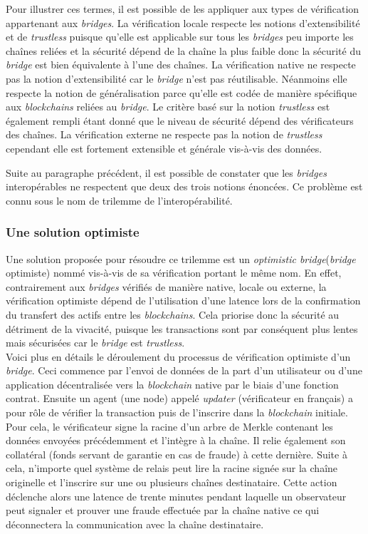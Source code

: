 Pour illustrer ces termes, il est possible de les appliquer aux types de vérification appartenant aux \textit{bridges}. La vérification locale respecte les notions d’extensibilité et de \textit{trustless} puisque qu'elle est applicable sur tous les \textit{bridges} peu importe les chaînes reliées et la sécurité dépend de la chaîne la plus faible donc la sécurité du \textit{bridge} est bien équivalente à l’une des chaînes.
La vérification native ne respecte pas la notion d’extensibilité car le \textit{bridge} n’est pas réutilisable. Néanmoins elle respecte la notion de généralisation parce qu’elle est codée de manière spécifique aux \textit{\gls{blockchain}s} reliées au \textit{bridge}. Le critère basé sur la notion \textit{trustless} est également rempli étant donné que le niveau de sécurité dépend des vérificateurs des chaînes.
La vérification externe ne respecte pas la notion de \textit{trustless} cependant elle est fortement extensible et générale vis-à-vis des données. \cite{NgraveVerif}

 Suite au paragraphe précédent, il est possible de constater que les \textit{bridges} interopérables ne respectent que deux des trois notions énoncées. Ce problème est connu sous le nom de trilemme de l’interopérabilité. 

\subsubsection{Une solution optimiste}

Une solution proposée pour résoudre ce trilemme est un \textit{optimistic bridge}(\textit{bridge} optimiste) nommé vis-à-vis de sa vérification portant le même nom\cite{OptimisticBhuptani}. En effet, contrairement aux \textit{bridges} vérifiés de manière native, locale ou externe, la vérification optimiste dépend de l’utilisation d’une latence lors de la confirmation du transfert des \gls{actif}s entre les \textit{\gls{blockchain}s}. Cela priorise donc la sécurité au détriment de la vivacité, puisque les transactions sont par conséquent plus lentes mais sécurisées car le \textit{bridge} est \textit{trustless}. \\

Voici plus en détails le déroulement du processus de vérification optimiste d’un \textit{bridge}.
Ceci commence par l’envoi de données de la part d’un utilisateur ou d’une application décentralisée vers la \textit{\gls{blockchain}} native par le biais d’une fonction contrat.
Ensuite un agent (une node) appelé \textit{updater} (vérificateur en français) a pour rôle de vérifier la transaction puis de l’inscrire dans la \textit{\gls{blockchain}} initiale. Pour cela, le vérificateur signe la racine d’un arbre de Merkle contenant les données envoyées précédemment et l’intègre à la chaîne. Il relie également son collatéral (fonds servant de garantie en cas de fraude) à cette dernière.
Suite à cela, n’importe quel système de relais peut lire la racine signée sur la chaîne originelle et l’inscrire sur une ou plusieurs chaînes destinataire. Cette action déclenche alors une latence de trente minutes pendant laquelle un observateur peut signaler et prouver une fraude effectuée par la chaîne native ce qui déconnectera la communication avec la chaîne destinataire. 

